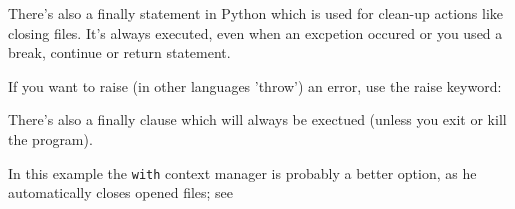         There's also a finally statement in Python which is used for clean-up actions like
        closing files. It's always executed, even when an excpetion occured or you used a break,
        continue or return statement.


        If you want to raise (in other languages 'throw') an error, use the raise keyword:

        There's also a finally clause which will always be exectued (unless you exit or kill
        the program).

        In this example the \texttt{with} context manager is probably a better option,
        as he automatically closes opened files; see 